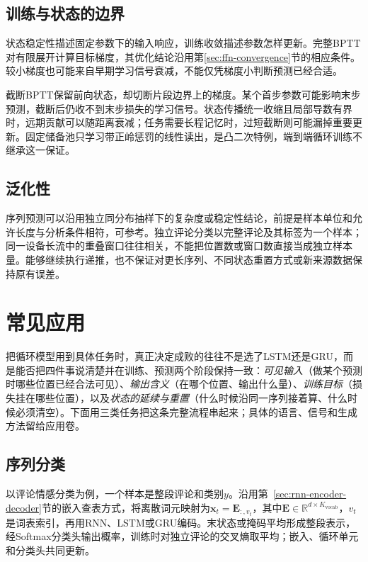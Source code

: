 \subsection{训练与状态的边界}
\label{sec:rnn-convergence}

状态稳定性描述固定参数下的输入响应，训练收敛描述参数怎样更新。完整BPTT对有限展开计算目标梯度，其优化结论沿用第\ref{sec:ffn-convergence}节的相应条件。较小梯度也可能来自早期学习信号衰减，不能仅凭梯度小判断预测已经合适。

截断BPTT保留前向状态，却切断片段边界上的梯度。某个首步参数可能影响末步预测，截断后仍收不到末步损失的学习信号。状态传播统一收缩且局部导数有界时，远期贡献可以随距离衰减；任务需要长程记忆时，过短截断则可能漏掉重要更新。固定储备池只学习带正岭惩罚的线性读出，是凸二次特例，端到端循环训练不继承这一保证。

\subsection{泛化性}
\label{sec:rnn-generalization}

序列预测可以沿用独立同分布抽样下的复杂度或稳定性结论，前提是样本单位和允许长度与分析条件相符，可参考。独立评论分类以完整评论及其标签为一个样本；同一设备长流中的重叠窗口往往相关，不能把位置数或窗口数直接当成独立样本量。能够继续执行递推，也不保证对更长序列、不同状态重置方式或新来源数据保持原有误差。

\FloatBarrier

\section{常见应用}
\label{sec:rnn-applications}

把循环模型用到具体任务时，真正决定成败的往往不是选了LSTM还是GRU，而是能否把四件事说清楚并在训练、预测两个阶段保持一致：\emph{可见输入}（做某个预测时哪些位置已经合法可见）、\emph{输出含义}（在哪个位置、输出什么量）、\emph{训练目标}（损失挂在哪些位置），以及\emph{状态的延续与重置}（什么时候沿同一序列接着算、什么时候必须清空）。下面用三类任务把这条完整流程串起来；具体的语言、信号和生成方法留给应用卷。

\subsection{序列分类}
\label{sec:rnn-application-classification}

以评论情感分类为例，一个样本是整段评论和类别$y$。沿用第~\ref{sec:rnn-encoder-decoder}节的嵌入查表方式，将离散词元映射为$\bm{x}_t=\bm{E}_{:,v_t}$，其中$\bm{E}\in\mathbb{R}^{d\times K_{\mathrm{vocab}}}$，$v_t$是词表索引，再用RNN、LSTM或GRU编码。末状态或掩码平均形成整段表示，经Softmax分类头输出概率，训练时对独立评论的交叉熵取平均；嵌入、循环单元和分类头共同更新。

